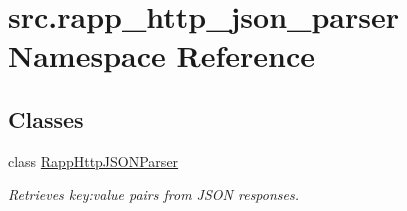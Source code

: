 \hypertarget{namespacesrc_1_1rapp__http__json__parser}{\section{src.\-rapp\-\_\-http\-\_\-json\-\_\-parser Namespace Reference}
\label{namespacesrc_1_1rapp__http__json__parser}
}
\subsection*{Classes}
\begin{DoxyCompactItemize}
\item 
class \hyperlink{classsrc_1_1rapp__http__json__parser_1_1RappHttpJSONParser}{Rapp\-Http\-J\-S\-O\-N\-Parser}
\begin{DoxyCompactList}\small\item\em Retrieves key\-:value pairs from J\-S\-O\-N responses. \end{DoxyCompactList}\end{DoxyCompactItemize}
